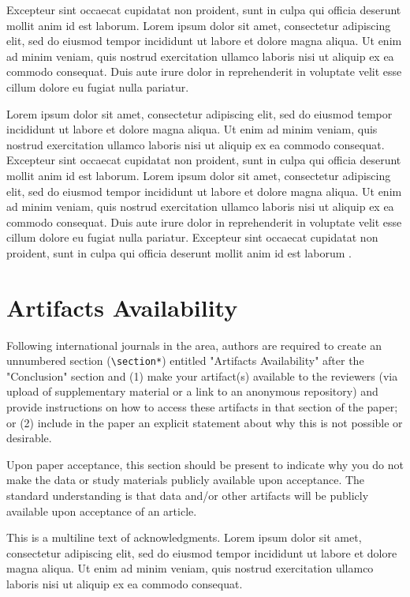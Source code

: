 \documentclass{sbc2025}%
\begin{document}
Excepteur sint occaecat cupidatat non proident, sunt in culpa qui officia deserunt mollit anim id est laborum. Lorem ipsum dolor sit amet, consectetur adipiscing elit, sed do eiusmod tempor incididunt ut labore et dolore magna aliqua. Ut enim ad minim veniam, quis nostrud exercitation ullamco laboris nisi ut aliquip ex ea commodo consequat. Duis aute irure dolor in reprehenderit in voluptate velit esse cillum dolore eu fugiat nulla pariatur. 

Lorem ipsum dolor sit amet, consectetur adipiscing elit, sed do eiusmod tempor incididunt ut labore et dolore magna aliqua. Ut enim ad minim veniam, quis nostrud exercitation ullamco laboris nisi ut aliquip ex ea commodo consequat. Excepteur sint occaecat cupidatat non proident, sunt in culpa qui officia deserunt mollit anim id est laborum. Lorem ipsum dolor sit amet, consectetur adipiscing elit, sed do eiusmod tempor incididunt ut labore et dolore magna aliqua. Ut enim ad minim veniam, quis nostrud exercitation ullamco laboris nisi ut aliquip ex ea commodo consequat. Duis aute irure dolor in reprehenderit in voluptate velit esse cillum dolore eu fugiat nulla pariatur. Excepteur sint occaecat cupidatat non proident, sunt in culpa qui officia deserunt mollit anim id est laborum \cite{abt2004}.

\section*{Artifacts Availability}

Following international journals in the area,
authors are required to create an unnumbered section (\verb|\section*|) 
entitled "Artifacts Availability" after the "Conclusion" section and 
(1) make your artifact(s) available to the reviewers (via upload of supplementary material or a link to an anonymous repository) 
and provide instructions on how to access these artifacts in that section of the paper; or
(2) include in the paper an explicit statement about why this is not possible or desirable.

Upon paper acceptance, this section should be present to
indicate why you do not make the data or study materials publicly available upon acceptance.
The standard understanding is that data and/or other artifacts will be publicly available upon acceptance of an article.


\begin{acknowledgements}
This is a multiline text of acknowledgments. Lorem ipsum dolor sit amet, consectetur adipiscing elit, sed do eiusmod tempor incididunt ut labore et dolore magna aliqua. Ut enim ad minim veniam, quis nostrud exercitation ullamco laboris nisi ut aliquip ex ea commodo consequat.
\end{acknowledgements}




\end{document}
